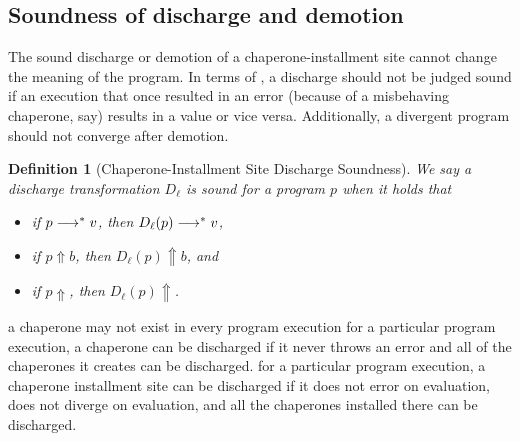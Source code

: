 \documentclass{sigplanconf}
\newtheorem{definition}{Definition}
\begin{document}

\subsection{Soundness of discharge and demotion}

The sound discharge or demotion of a chaperone-installment site cannot change the meaning of the program.
In terms of \chapcalc, a discharge should not be judged sound if an execution that once resulted in an error (because of a misbehaving chaperone, say) results in a value or vice versa.
Additionally, a divergent program should not converge after demotion.


\begin{definition}[Chaperone-Installment Site Discharge Soundness]
We say a discharge transformation $D_\ell$ is sound for a program $p$ when it holds that
\begin{itemize}
\item if $p\longrightarrow^{*} v$, then $D_\ell(p)\longrightarrow^{*} v$,
\item if $p\Uparrow b$, then $D_\ell(p)\Uparrow b$, and
\item if $p\Uparrow$, then $D_\ell(p)\Uparrow$.
\end{itemize}
\end{definition}


a chaperone may not exist in every program execution
for a particular program execution, a chaperone can be discharged if it never throws an error and all of the chaperones it creates can be discharged.
for a particular program execution, a chaperone installment site can be discharged if it does not error on evaluation, does not diverge on evaluation, and all the chaperones installed there can be discharged.


\end{document}
